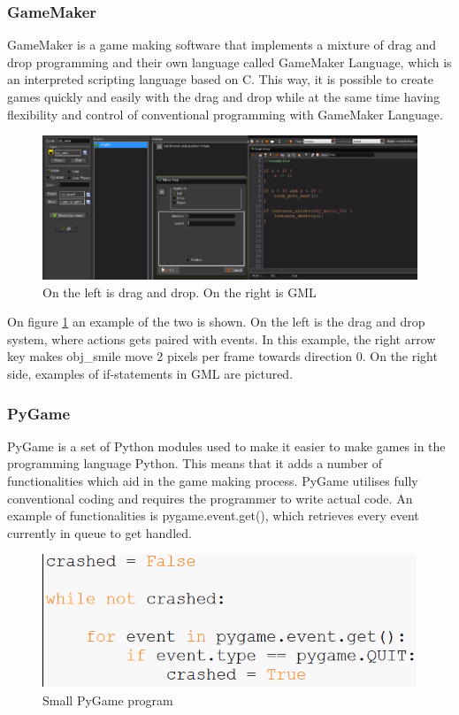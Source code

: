 \subsubsection{GameMaker}
GameMaker is a game making software that implements a mixture of drag and drop programming and their own language called GameMaker Language, which is an interpreted scripting language based on C. This way, it is possible to create games quickly and easily with the drag and drop while at the same time having flexibility and control of conventional programming with GameMaker Language.

\begin{figure}[H]
\centering
\includegraphics[scale=0.5]{resources/Images/GameMaker.PNG}
\caption{On the left is drag and drop\cite{GMDnD}. On the right is GML \cite{GML}}
\label{fig:GameMaker}
\end{figure}

On figure \ref{fig:GameMaker} an example of the two is shown. On the left is the drag and drop system, where actions gets paired with events. In this example, the right arrow key makes obj\_smile move 2 pixels per frame towards direction 0. On the right side, examples of if-statements in GML are pictured.

\subsubsection{PyGame}
PyGame is a set of Python modules used to make it easier to make games in the programming language Python. This means that it adds a number of functionalities which aid in the game making process. PyGame utilises fully conventional coding and requires the programmer to write actual code.
An example of functionalities is pygame.event.get(), which retrieves every event currently in queue to get handled.

\begin{figure}[H]
\centering
\includegraphics[scale=0.6]{resources/Images/PyGame.png}
\caption{Small PyGame program}
\label{fig:PyGame}
\end{figure}

